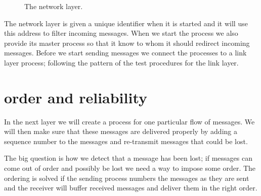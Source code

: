 \documentclass[a4paper,11pt]{article}
\begin{document}
\begin{figure}
\centering  
{}
\caption{The network layer.}
\label{fig:net}
\end{figure}

The network layer is given a unique identifier when it is started and
it will use this address to filter incoming messages. When we start the
process we also provide its master process so that it know to whom it
should redirect incoming messages. Before we start sending messages we
connect the processes to a link layer process; following the pattern of
the test procedures for the link layer.


\section{order and reliability}

In the next layer we will create a process for one particular flow of
messages. We will then make sure that these messages are delivered
properly by adding a sequence number to the messages and re-transmit
messages that could be lost. 

The big question is how we detect that a message has been lost; if
messages can come out of order and possibly be lost we need a way to
impose some order. The ordering is solved if the sending process
numbers the messages as they are sent and the receiver will buffer
received messages and deliver them in the right order. 
\end{document}
